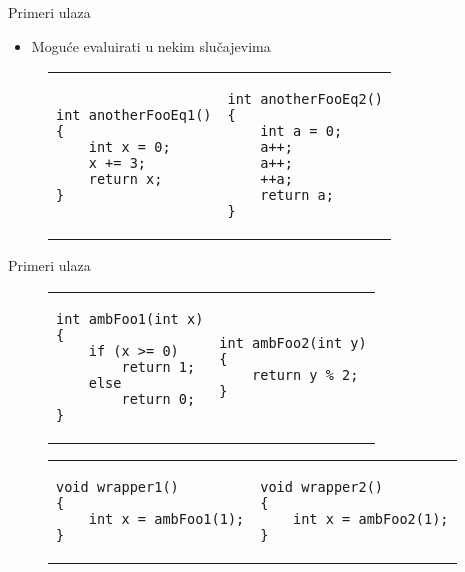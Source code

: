 \begin{frame}[fragile]{Primeri ulaza}
    \begin{itemize}
        \item Mogu\'c{}e evaluirati u nekim slu\v{c}ajevima
    \end{itemize}
\begin{figure}[!h]
\centering
\begin{tabular}{ p{4.5cm} p{4.5cm} }
\begin{lstlisting}
int anotherFooEq1()
{
    int x = 0;
    x += 3;
    return x;
}
\end{lstlisting}
&
\begin{lstlisting}
int anotherFooEq2()
{
    int a = 0;
    a++;
    a++;
    ++a;
    return a;
}
\end{lstlisting}
\end{tabular}
\end{figure}
\end{frame}


\begin{frame}[fragile]{Primeri ulaza}
\begin{figure}[!h]
\centering
\begin{tabular}{ p{4.5cm} p{4.5cm} }
\begin{lstlisting}
int ambFoo1(int x)
{
    if (x >= 0)
        return 1;
    else
        return 0;
}
\end{lstlisting}
&
\begin{lstlisting}
int ambFoo2(int y)
{
    return y % 2;
}
\end{lstlisting}
\end{tabular}
\end{figure}

\begin{figure}[!h]
\centering
\begin{tabular}{ p{4.5cm} p{4.5cm} }
\begin{lstlisting}
void wrapper1()
{
    int x = ambFoo1(1);
}
\end{lstlisting}
&
\begin{lstlisting}
void wrapper2()
{
    int x = ambFoo2(1);
}
\end{lstlisting}
\end{tabular}
\end{figure}
\end{frame}
